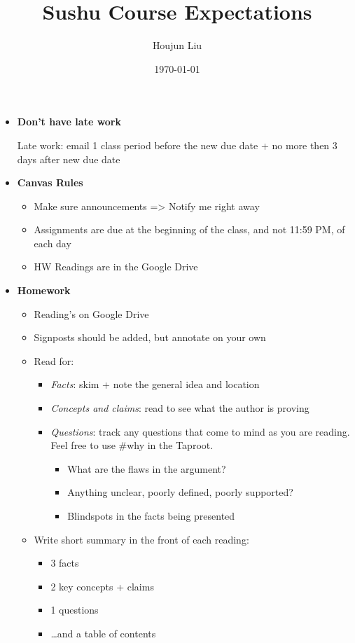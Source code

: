 \documentclass[letterpaper]{article}
\author{Houjun Liu}
\date{\today}
\title{Sushu Course Expectations}
\renewcommand\maketitle{}
\begin{document}
\maketitle
\begin{itemize}
\item \textbf{Don't have late work}

Late work: email 1 class period before the new due date + no more then
3 days after new due date

\item \textbf{Canvas Rules}

\begin{itemize}
\item Make sure announcements => Notify me right away
\item Assignments are due at the beginning of the class, and not 11:59 PM,
of each day
\item HW Readings are in the Google Drive
\end{itemize}

\item \textbf{Homework}

\begin{itemize}
\item Reading's on Google Drive
\item Signposts should be added, but annotate on your own
\item Read for:

\begin{itemize}
\item \emph{Facts}: skim + note the general idea and location
\item \emph{Concepts and claims}: read to see what the author is proving
\item \emph{Questions}: track any questions that come to mind as you are
reading. Feel free to use \#why in the Taproot.

\begin{itemize}
\item What are the flaws in the argument?
\item Anything unclear, poorly defined, poorly supported?
\item Blindspots in the facts being presented
\end{itemize}
\end{itemize}

\item Write short summary in the front of each reading:

\begin{itemize}
\item 3 facts
\item 2 key concepts + claims
\item 1 questions
\item \ldots{}and a table of contents
\end{itemize}


\end{itemize}
\end{itemize}
\end{document}
